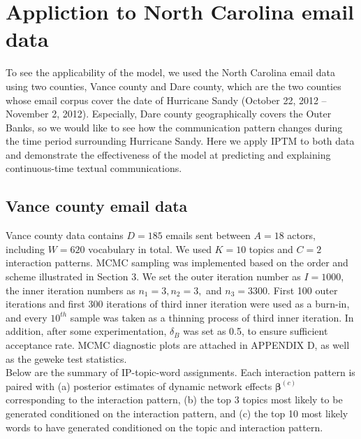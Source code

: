 \documentclass[a4paper]{article}
\begin{document}
 \section{Appliction to North Carolina email data}
 To see the applicability of the model, we used the North Carolina email data using two counties, Vance county and Dare county, which are the two counties whose email corpus cover the date of Hurricane Sandy (October 22, 2012 – November 2, 2012). Especially, Dare county geographically covers the Outer Banks, so we would like to see how the communication pattern changes during the time period surrounding Hurricane Sandy. Here we apply IPTM to both data and demonstrate the effectiveness of the model at predicting and explaining continuous-time textual communications.
 \subsection{Vance county email data}
Vance county data contains $D=185$ emails sent between $A=18$ actors, including $W=620$ vocabulary in total. We used $K=10$ topics and $C=2$ interaction patterns. MCMC sampling was implemented based on the order and scheme illustrated in Section 3. We set the outer iteration number as $I=1000$, the inner iteration numbers as $n_1=3, n_2=3,$ and $n_3=3300$. First 100 outer iterations and first 300 iterations of third inner iteration were used as a burn-in, and every $10^{th}$ sample was taken as a thinning process of third inner iteration. In addition, after some experimentation, $\delta_B$ was set as 0.5, to ensure sufficient acceptance rate. MCMC diagnostic plots are attached in APPENDIX D, as well as the geweke test statistics. \\\newline
 Below are the summary of IP-topic-word assignments. Each interaction pattern is paired with (a) posterior estimates of dynamic network effects $\boldsymbol{\beta}^{(c)}$ corresponding to the interaction pattern, (b) the top 3 topics most likely to be generated conditioned on the interaction pattern, and (c) the top 10 most likely words to have generated conditioned on the topic and interaction pattern.
\end{document}

